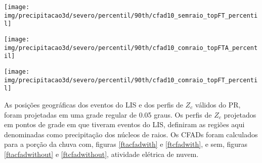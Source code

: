 \begin{sidewaysfigure}%
\centering
\texttt{[image: img/precipitacao3d/severo/percentil/90th/cfad10\_semraio\_topFT\_percentil]}
\caption{CFADs para os extremos de FT	. Porção da precipitação sem raios.}
\label{ftcfadwithout}
\end{sidewaysfigure} 


\begin{sidewaysfigure}%
  \centering
  \texttt{[image: img/precipitacao3d/severo/percentil/90th/cfad10\_comraio\_topFTA\_percentil]}
  \caption{CFADs para os extremos de FTA. Porção da precipitação com raios.}
  \label{ftacfadwith}   
\end{sidewaysfigure} 


\begin{sidewaysfigure}%
  \centering
  \texttt{[image: img/precipitacao3d/severo/percentil/90th/cfad10\_comraio\_topFT\_percentil]}
  \caption{CFADs para os extremos de FT. Porção da precipitação com raios.}
  \label{ftcfadwith}   
\end{sidewaysfigure} 


As posições geográficas dos eventos do LIS e dos perfis de $Z_c$ válidos do PR, foram projetadas em uma grade regular de 0.05 graus. Os perfis de $Z_c$ projetados em pontos de grade em que tiveram eventos do LIS, definiram as regiões aqui denominadas como precipitação dos núcleos de raios. Os CFADs foram calculados para a porção da chuva com, figuras \ref{ftacfadwith} e \ref{ftcfadwith}, e sem, figuras \ref{ftacfadwithout} e \ref{ftcfadwithout}, atividade elétrica de nuvem.

